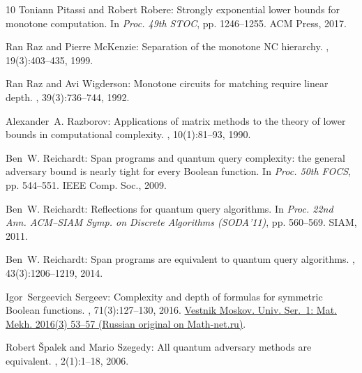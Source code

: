 \documentclass[11pt]{article}
\numberwithin{equation}{section}
\theoremstyle{definition}
\theoremstyle{plain}
\theoremstyle{definition}\newtheorem{notation}[theorem]{Notation}\theoremstyle{plain}
\begin{document}
\begin{thebibliography}{10}
{\sc Toniann Pitassi and Robert Robere}: Strongly exponential lower bounds for
  monotone computation.
\newblock In {\em Proc. 49th STOC}, pp. 1246--1255. ACM Press, 2017.
\newblock [\epfmtdoi{10.1145/3055399.3055478}]

{\sc Ran Raz and Pierre McKenzie}: Separation of the monotone {NC} hierarchy.
, 19(3):403--435, 1999.
\newblock [\epfmtdoi{10.1007/s004930050062}]

{\sc Ran Raz and Avi Wigderson}: Monotone circuits for matching require linear
  depth.
, 39(3):736--744, 1992.
\newblock [\epfmtdoi{10.1145/146637.146684}]

{\sc Alexander~A. Razborov}: Applications of matrix methods to the theory of
  lower bounds in computational complexity.
, 10(1):81--93, 1990.
\newblock [\epfmtdoi{10.1007/BF02122698}]

{\sc Ben~W. Reichardt}: Span programs and quantum query complexity: the general
  adversary bound is nearly tight for every {B}oolean function.
\newblock In {\em Proc. 50th FOCS}, pp. 544--551. IEEE Comp. Soc., 2009.

{\sc Ben~W. Reichardt}: Reflections for quantum query algorithms.
\newblock In {\em Proc. 22nd Ann. ACM--SIAM Symp. on Discrete Algorithms
  (SODA'11)}, pp. 560--569. SIAM, 2011.
\newblock [\epfmtdoi{10.1137/1.9781611973082.44}]

{\sc Ben~W. Reichardt}: Span programs are equivalent to quantum query
  algorithms.
, 43(3):1206--1219, 2014.
\newblock [\epfmtdoi{10.1137/100792640}]

{\sc Igor~Sergeevich Sergeev}: Complexity and depth of formulas for symmetric
  {B}oolean functions.
, 71(3):127--130, 2016.
\newblock \href{https://mi.mathnet.ru/vmumm155}{Vestnik Moskov. Univ. Ser.~1:
  Mat. Mekh. 2016(3) 53--57 (Russian original on Math-net.ru)}.
\newblock [\epfmtdoi{10.3103/S0027132216030098}]

{\sc Robert {\v{S}}palek and Mario Szegedy}: All quantum adversary methods are
  equivalent.
, 2(1):1--18, 2006.


\end{thebibliography}
\end{document}

